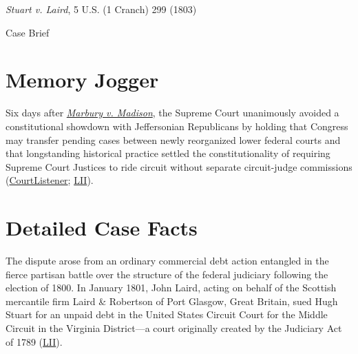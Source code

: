 \documentclass[12pt]{article}
\begin{document}
\begin{center}
{\LARGE \textit{Stuart v. Laird}, 5 U.S. (1 Cranch) 299 (1803)\par}
\vspace{0.8em}
{\large Case Brief\par}
\end{center}
\vspace{1em}

\section{Memory Jogger}

Six days after \href{https://www.govinfo.gov/app/details/USREPORTS-5/USREPORTS-5-137/context}{\textit{Marbury v. Madison}}, the Supreme Court unanimously avoided a constitutional showdown with Jeffersonian Republicans by holding that Congress may transfer pending cases between newly reorganized lower federal courts and that longstanding historical practice settled the constitutionality of requiring Supreme Court Justices to ride circuit without separate circuit-judge commissions (\href{https://www.courtlistener.com/opinion/84769/stuart-v-laird/}{CourtListener}; \href{https://www.law.cornell.edu/supremecourt/text/5/299}{LII}).

\section{Detailed Case Facts}

The dispute arose from an ordinary commercial debt action entangled in the fierce partisan battle over the structure of the federal judiciary following the election of 1800. In January 1801, John Laird, acting on behalf of the Scottish mercantile firm Laird \& Robertson of Port Glasgow, Great Britain, sued Hugh Stuart for an unpaid debt in the United States Circuit Court for the Middle Circuit in the Virginia District---a court originally created by the Judiciary Act of 1789 (\href{https://www.law.cornell.edu/supremecourt/text/5/299}{LII}).
\end{document}
